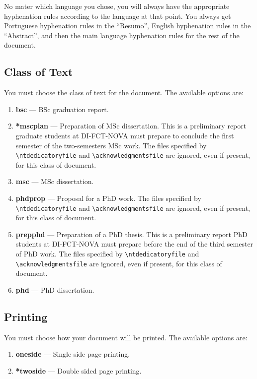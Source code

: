 No mater which language you chose, you will always have the appropriate hyphenation rules according to the language at that point. You always get Portuguese hyphenation rules in the ``Resumo'', English hyphenation rules in the ``Abstract'', and then the main language hyphenation rules for the rest of the document.




\subsection{Class of Text}
\label{sub:class_of_text}

You must choose the class of text for the document. The available options are:

\begin{enumerate}
	\item \textbf{bsc} --- BSc graduation report.
	\item \textbf{*mscplan} --- Preparation of MSc dissertation. This is a preliminary report graduate students at DI-FCT-NOVA must prepare to conclude the first semester of the two-semesters MSc work. The files specified by \verb!\ntdedicatoryfile! and \verb!\acknowledgmentsfile! are ignored, even if present, for this class of document.
	\item \textbf{msc} --- MSc dissertation.
	\item \textbf{phdprop} ---  Proposal for a PhD work. The files specified by \verb!\ntdedicatoryfile! and \verb!\acknowledgmentsfile! are ignored, even if present, for this class of document.
	\item \textbf{prepphd} ---  Preparation of a PhD thesis. This is a preliminary report PhD students at DI-FCT-NOVA must prepare before the end of the third semester of PhD work. The files specified by \verb!\ntdedicatoryfile! and \verb!\acknowledgmentsfile! are ignored, even if present, for this class of document.
	\item \textbf{phd} --- PhD dissertation.
\end{enumerate}

\subsection{Printing}
\label{sub:printing}

You must choose how your document will be printed. The available options are:
\begin{enumerate}
	\item \textbf{oneside} --- Single side page printing.
	\item \textbf{*twoside} --- Double sided page printing.
\end{enumerate}

